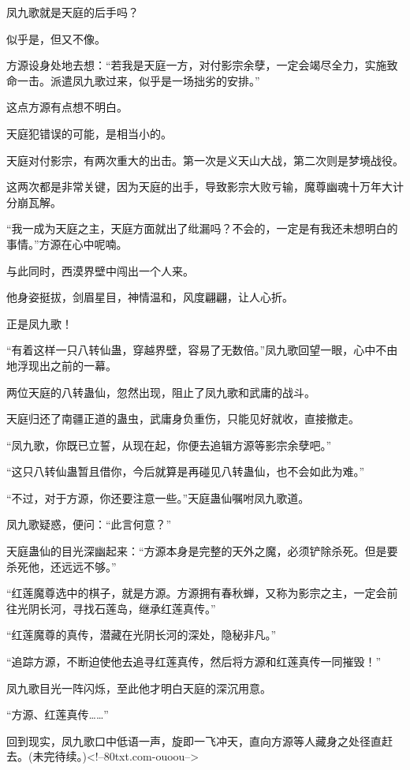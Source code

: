 \begin{this_body}
凤九歌就是天庭的后手吗？

似乎是，但又不像。

方源设身处地去想：“若我是天庭一方，对付影宗余孽，一定会竭尽全力，实施致命一击。派遣凤九歌过来，似乎是一场拙劣的安排。”

这点方源有点想不明白。

天庭犯错误的可能，是相当小的。

天庭对付影宗，有两次重大的出击。第一次是义天山大战，第二次则是梦境战役。

这两次都是非常关键，因为天庭的出手，导致影宗大败亏输，魔尊幽魂十万年大计分崩瓦解。

“我一成为天庭之主，天庭方面就出了纰漏吗？不会的，一定是有我还未想明白的事情。”方源在心中呢喃。

与此同时，西漠界壁中闯出一个人来。

他身姿挺拔，剑眉星目，神情温和，风度翩翩，让人心折。

正是凤九歌！

“有着这样一只八转仙蛊，穿越界壁，容易了无数倍。”凤九歌回望一眼，心中不由地浮现出之前的一幕。

两位天庭的八转蛊仙，忽然出现，阻止了凤九歌和武庸的战斗。

天庭归还了南疆正道的蛊虫，武庸身负重伤，只能见好就收，直接撤走。

“凤九歌，你既已立誓，从现在起，你便去追辑方源等影宗余孽吧。”

“这只八转仙蛊暂且借你，今后就算是再碰见八转蛊仙，也不会如此为难。”

“不过，对于方源，你还要注意一些。”天庭蛊仙嘱咐凤九歌道。

凤九歌疑惑，便问：“此言何意？”

天庭蛊仙的目光深幽起来：“方源本身是完整的天外之魔，必须铲除杀死。但是要杀死他，还远远不够。”

“红莲魔尊选中的棋子，就是方源。方源拥有春秋蝉，又称为影宗之主，一定会前往光阴长河，寻找石莲岛，继承红莲真传。”

“红莲魔尊的真传，潜藏在光阴长河的深处，隐秘非凡。”

“追踪方源，不断迫使他去追寻红莲真传，然后将方源和红莲真传一同摧毁！”

凤九歌目光一阵闪烁，至此他才明白天庭的深沉用意。

“方源、红莲真传……”

回到现实，凤九歌口中低语一声，旋即一飞冲天，直向方源等人藏身之处径直赶去。(未完待续。)<!--80txt.com-ouoou-->

\end{this_body}

